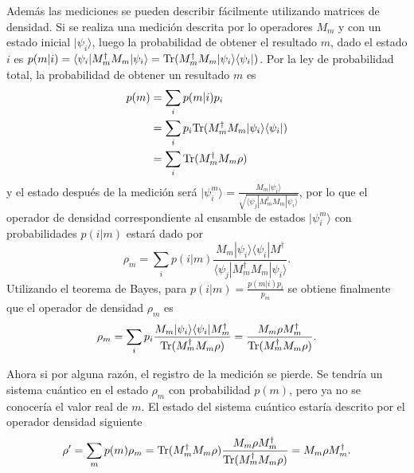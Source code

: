 Además las mediciones se pueden describir fácilmente utilizando matrices de
densidad. Si se realiza una medición descrita por lo operadores $M_m$ y con un
estado inicial $|\psi_i\rangle$, luego la probabilidad de obtener el resultado
$m$, dado el estado $i$ es $p(m|i)=\langle
\psi_i|M_m^{\dagger}M_m|\psi_i\rangle = {\rm Tr}(M_m^{\dagger} M_m |\psi_i\rangle
\langle\psi_i|)$. Por la ley de probabilidad total,
 la probabilidad de
obtener un resultado $m$ es {\cite{nielsen_chuang_2010}}
\begin{equation}
	\label{probabilidad_m}
	\begin{split}
	p(m) &= \sum_{i}p(m|i)p_i\\
	&=\sum_i p_i{\rm Tr}(M_m^{\dagger} M_m |\psi_i\rangle \langle\psi_i|)\\
	&=\sum_{i}{\rm Tr}(M_m^{\dagger} M_m \rho)
	\end{split}
\end{equation} y el estado después de la medición será $|\psi_i^m\rangle=\frac{M_m|\psi_i\rangle}{\sqrt{\langle\psi_j|M_m^{\dagger}M_m|\psi_i\rangle}}$, por lo que el operador de densidad correspondiente al ensamble de estados $|\psi_i^m\rangle$ con probabilidades $p(i|m)$ estará dado por \[\rho_m=\sum_i p(i|m)\frac{M_m|\psi_i\rangle \langle \psi_i|M^{\dagger}}{\langle\psi_j|M_m^{\dagger}M_m|\psi_i\rangle}.\] Utilizando el teorema de Bayes, para $p(i|m)=\frac{p(m|i)p_i}{p_m}$ se obtiene finalmente que el operador de densidad $\rho_m$ es {\cite{nielsen_chuang_2010}} \begin{equation}
	\rho_m=\sum_i p_i \dfrac{M_m|\psi_i\rangle \langle \psi_i|M_m^{\dagger}}{{\rm Tr}(M^{\dagger}_m M_m \rho )}=\dfrac{M_m \rho M_m^{\dagger}}{{\rm Tr} (M^{\dagger}_m M_m\rho )}.
\end{equation}


Ahora si por alguna razón, el registro de la medición se pierde. Se tendría un
sistema cuántico en el estado $\rho_m$ con probabilidad $p(m)$, pero ya no se
conocería el valor real de $m$. El estado del sistema cuántico estaría descrito
por el operador densidad siguiente \begin{equation}
	\rho'=\sum_m p(m)\rho_m={\rm Tr}(M^{\dagger}_m M_m\rho )\dfrac{M_m\rho M_m^{\dagger}}{{\rm Tr} (M^{\dagger}_m M_m \rho )}=M_m\rho M_m^{\dagger}.
\end{equation}


